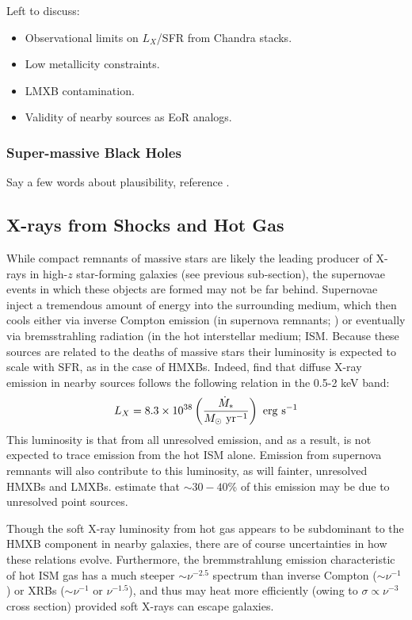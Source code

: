 Left to discuss:
\begin{itemize}
	\item Observational limits on $L_X$/SFR from Chandra stacks.
	\item Low metallicity constraints.
	\item LMXB contamination.
	\item Validity of nearby sources as EoR analogs.
\end{itemize}


\subsubsection{Super-massive Black Holes}
{\color{red} Say a few words about plausibility, reference \cite{Tanaka2016}.}



\subsection{X-rays from Shocks and Hot Gas}
While compact remnants of massive stars are likely the leading producer of X-rays in high-$z$ star-forming galaxies (see previous sub-section), the supernovae events in which these objects are formed may not be far behind. Supernovae inject a tremendous amount of energy into the surrounding medium, which then cools either via inverse Compton emission (in supernova remnants; \cite{Oh2001}) or eventually via bremsstrahling radiation (in the hot interstellar medium; ISM. Because these sources are related to the deaths of massive stars their luminosity is expected to scale with SFR, as in the case of HMXBs. Indeed, \cite{Mineo2012b} find that diffuse X-ray emission in nearby sources follows the following relation in the 0.5-2 keV band:
\begin{equation}
	L_X = 8.3 \times 10^{38} \left(\frac{\SFR}{M_{\odot} \ \mathrm{yr}^{-1}} \right) \ \mathrm{erg} \ \mathrm{s}^{-1} \label{eq:LxSFRII_Mineo}
\end{equation}
This luminosity is that from all unresolved emission, and as a result, is not expected to trace emission from the hot ISM alone. Emission from supernova remnants will also contribute to this luminosity, as will fainter, unresolved HMXBs and LMXBs. \cite{Mineo2012b} estimate that $\sim 30-40$\% of this emission may be due to unresolved point sources. 

Though the soft X-ray luminosity from hot gas appears to be subdominant to the HMXB component in nearby galaxies, there are of course uncertainties in how these relations evolve. Furthermore, the bremmstrahlung emission characteristic of hot ISM gas has a much steeper $\sim \nu^{-2.5}$ spectrum than inverse Compton ($\sim \nu^{-1}$) or XRBs ($\sim \nu^{-1}$ or $\nu^{-1.5}$), and thus may heat more efficiently (owing to $\sigma \propto \nu^{-3}$ cross section) provided soft X-rays can escape galaxies. 

